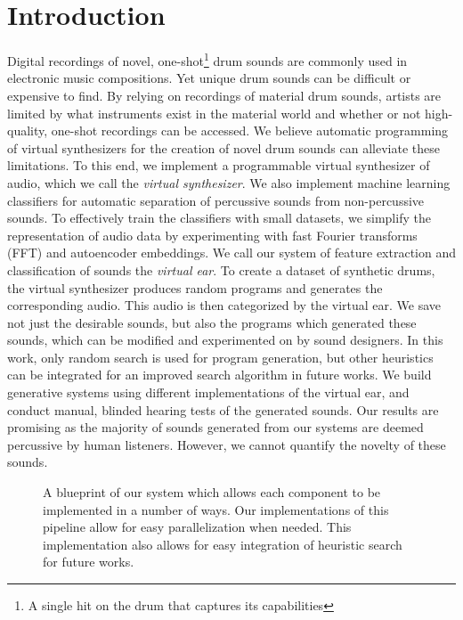 \documentclass[runningheads,a4paper]{llncs}
\begin{document}
\section{Introduction} 
Digital recordings of novel, one-shot\footnote{A single hit on the drum that captures its capabilities} drum sounds are commonly used in  electronic music compositions. Yet unique drum sounds can be difficult or expensive to find. By relying on recordings of material drum sounds, artists are limited by what instruments exist in the material world and whether or not high-quality, one-shot recordings can be accessed. We believe automatic programming of virtual synthesizers for the creation of novel drum sounds can alleviate these limitations. To this end, we implement a programmable virtual synthesizer of audio, which we call the \emph{virtual synthesizer}. We also implement machine learning classifiers for automatic separation of percussive sounds from non-percussive sounds. To effectively train the classifiers with small datasets, we simplify the representation of audio data by experimenting with fast Fourier transforms (FFT) and autoencoder embeddings. We call our system of feature extraction and classification of sounds the \emph{virtual ear}. To create a dataset of synthetic drums, the virtual synthesizer produces random programs and generates the corresponding audio. This audio is then categorized by the virtual ear. We save not just the desirable sounds, but also the programs which generated these sounds, which can be modified and experimented on by sound designers. In this work, only random search is used for program generation, but other heuristics can be integrated for an improved search algorithm in future works. We build generative systems using different implementations of the virtual ear, and conduct manual, blinded hearing tests of the generated sounds. Our results are promising as the majority of sounds generated from our systems are deemed percussive by human listeners. However, we cannot quantify the novelty of these sounds. 
 \begin{figure}[t!]
    \begin{center}
    \end{center}
    \caption{A blueprint of our system which allows each component to be implemented in a number of ways. Our implementations of this pipeline allow for easy parallelization when needed. This implementation also allows for easy integration of heuristic search for future works. 
    }
\label{fig:pipeline_outline}
\end{figure}
\end{document}
